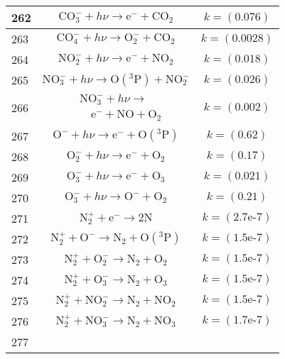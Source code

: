 \begin{longtable}{| m{} | m{}| m{} |}
 262 & $$ \mathrm{CO_3^-} + h\nu\longrightarrow \mathrm{e^-} + \mathrm{CO_2} $$ & $$k = (\textrm{0.076}) $$ \\
\hline
 263 & $$ \mathrm{CO_4^-} + h\nu\longrightarrow \mathrm{O_2^-} + \mathrm{CO_2} $$ & $$k = (\textrm{0.0028}) $$ \\
\hline
 264 & $$ \mathrm{NO_2^-} + h\nu\longrightarrow \mathrm{e^-} + \mathrm{NO_2} $$ & $$k = (\textrm{0.018}) $$ \\
\hline
 265 & $$ \mathrm{NO_3^-} + h\nu\longrightarrow \mathrm{O(^3P)} + \mathrm{NO_2^-} $$ & $$k = (\textrm{0.026}) $$ \\
\hline
 266 & $$
\begin{aligned}
&\mathrm{NO_3^-} + h\nu \longrightarrow \\
&\quad \mathrm{e^-} + \mathrm{NO} + \mathrm{O_2}
\end{aligned}
$$ & $$k = (\textrm{0.002}) $$ \\
\hline
 267 & $$ \mathrm{O^-} + h\nu\longrightarrow \mathrm{e^-} + \mathrm{O(^3P)} $$ & $$k = (\textrm{0.62}) $$ \\
\hline
 268 & $$ \mathrm{O_2^-} + h\nu\longrightarrow \mathrm{e^-} + \mathrm{O_2} $$ & $$k = (\textrm{0.17}) $$ \\
\hline
 269 & $$ \mathrm{O_3^-} + h\nu\longrightarrow \mathrm{e^-} + \mathrm{O_3} $$ & $$k = (\textrm{0.021}) $$ \\
\hline
 270 & $$ \mathrm{O_3^-} + h\nu\longrightarrow \mathrm{O^-} + \mathrm{O_2} $$ & $$k = (\textrm{0.21}) $$ \\
\hline
 271 & $$ \mathrm{N_2^+} + \mathrm{e^-}\longrightarrow 2\mathrm{N} $$ & $$k = (\textrm{2.7e-7}) $$ \\
\hline
 272 & $$ \mathrm{N_2^+} + \mathrm{O^-}\longrightarrow \mathrm{N_2} + \mathrm{O(^3P)} $$ & $$k = (\textrm{1.5e-7}) $$ \\
\hline
 273 & $$ \mathrm{N_2^+} + \mathrm{O_2^-}\longrightarrow \mathrm{N_2} + \mathrm{O_2} $$ & $$k = (\textrm{1.5e-7}) $$ \\
\hline
 274 & $$ \mathrm{N_2^+} + \mathrm{O_3^-}\longrightarrow \mathrm{N_2} + \mathrm{O_3} $$ & $$k = (\textrm{1.5e-7}) $$ \\
\hline
 275 & $$ \mathrm{N_2^+} + \mathrm{NO_2^-}\longrightarrow \mathrm{N_2} + \mathrm{NO_2} $$ & $$k = (\textrm{1.5e-7}) $$ \\
\hline
 276 & $$ \mathrm{N_2^+} + \mathrm{NO_3^-}\longrightarrow \mathrm{N_2} + \mathrm{NO_3} $$ & $$k = (\textrm{1.7e-7}) $$ \\
\hline
 277 & $$
\begin{aligned}

\end{aligned}$$
\end{longtable}
